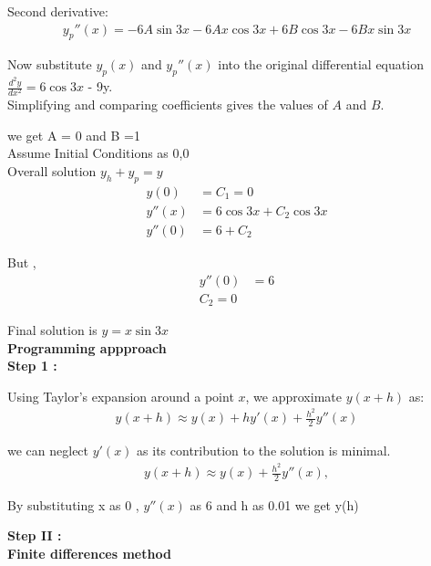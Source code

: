 \documentclass[journal]{IEEEtran}
\begin{document}
Second derivative:
\begin{align}
    y_p''(x) = -6A \sin 3x -6Ax \cos 3x + 6B \cos 3x - 6Bx \sin 3x 
\end{align}

Now substitute \( y_p(x) \) and \( y_p''(x) \) into the original differential equation \( \frac{d^2y}{dx^2} = 6 \cos 3x  \) - 9y.\\

Simplifying and comparing coefficients gives the values of \( A \) and \( B \).

we get A = 0 and B =1 \\

Assume  Initial Conditions as 0,0\\

Overall solution $y_h+y_p=y$
 \begin{align}
     y(0) &= C_1 = 0\\
     y''(x) &= 6 \cos{3x} + C_2 \cos 3x\\
     y''(0) &= 6 + C_2
 \end{align}
 
 But , 
 \begin{align}
     y''(0) &= 6 \\
     C_2 = 0
 \end{align}

 Final solution is $y = x \sin{3x}$\\

\textbf{Programming appproach }\\

\textbf{Step 1 : \\}

Using Taylor's expansion around a point \( x \), we approximate \( y(x+h) \) as:\\
\begin{align}
y(x+h) \approx y(x) + h y'(x) + \frac{h^2}{2} y''(x)
\end{align}

we can neglect $y'(x)$ as its contribution to the solution is minimal.\\
\begin{align}
y(x+h) \approx y(x) + \frac{h^2}{2} y''(x),
\end{align}

By substituting x as 0 , $y''(x)$ as 6 and h as 0.01 we get y(h)

\textbf{Step II :}\\

\textbf{Finite differences method}\\
\end{document}
